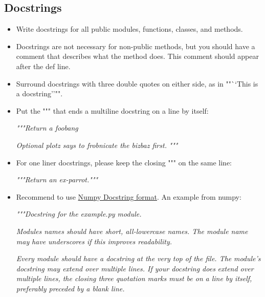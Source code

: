 \documentclass[
]{book}
\newenvironment{Shaded}{\begin{snugshade}}{\end{snugshade}}
\newcommand{\CommentTok}[1]{\textcolor[rgb]{0.56,0.35,0.01}{\textit{#1}}}
\begin{document}
\hypertarget{docstrings}{%
\subsection{Docstrings}\label{docstrings}}

\begin{itemize}
\item
  Write docstrings for all public modules, functions, classes, and methods.
\item
  Docstrings are not necessary for non-public methods, but you should have a
  comment that describes what the method does. This comment should appear after
  the def line.
\item
  Surround docstrings with three double quotes on either side, as in ""``This is
  a docstring''"".
\item
  Put the """ that ends a multiline docstring on a line by itself:

\begin{Shaded}
\begin{Highlighting}[]
\CommentTok{"""Return a foobang}

\CommentTok{Optional plotz says to frobnicate the bizbaz first.}
\CommentTok{"""}
\end{Highlighting}
\end{Shaded}
\item
  For one liner docstrings, please keep the closing """ on the same line:

\begin{Shaded}
\begin{Highlighting}[]
\CommentTok{"""Return an ex-parrot."""}
\end{Highlighting}
\end{Shaded}
\item
  Recommend to use
  \href{https://numpydoc.readthedocs.io/en/latest/format.html}{Numpy Docstring format}.
  An example from numpy:

\begin{Shaded}
\begin{Highlighting}[]
\CommentTok{"""Docstring for the example.py module.}

\CommentTok{Modules names should have short, all-lowercase names.  The module name may}
\CommentTok{have underscores if this improves readability.}

\CommentTok{Every module should have a docstring at the very top of the file.  The}
\CommentTok{module's docstring may extend over multiple lines.  If your docstring does}
\CommentTok{extend over multiple lines, the closing three quotation marks must be on}
\CommentTok{a line by itself, preferably preceded by a blank line.}


\end{Highlighting}
\end{Shaded}
\end{itemize}
\end{document}
